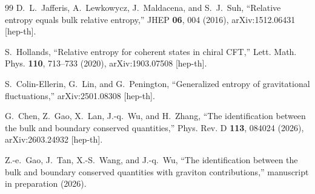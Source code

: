 \begin{thebibliography}{99}
D.~L.~Jafferis, A.~Lewkowycz, J.~Maldacena, and S.~J.~Suh,
“Relative entropy equals bulk relative entropy,”
JHEP \textbf{06}, 004 (2016),
arXiv:1512.06431 [hep-th].

S.~Hollands,
“Relative entropy for coherent states in chiral CFT,”
Lett. Math. Phys. \textbf{110}, 713--733 (2020),
arXiv:1903.07508 [hep-th].

S.~Colin-Ellerin, G.~Lin, and G.~Penington,
“Generalized entropy of gravitational fluctuations,”
arXiv:2501.08308 [hep-th].

G.~Chen, Z.~Gao, X.~Lan, J.-q.~Wu, and H.~Zhang,
“The identification between the bulk and boundary conserved quantities,”
Phys. Rev. D \textbf{113}, 084024 (2026),
arXiv:2603.24932 [hep-th].

Z.-e.~Gao, J.~Tan, X.-S.~Wang, and J.-q.~Wu,
“The identification between the bulk and boundary conserved quantities with graviton contributions,”
manuscript in preparation (2026).

\end{thebibliography}
